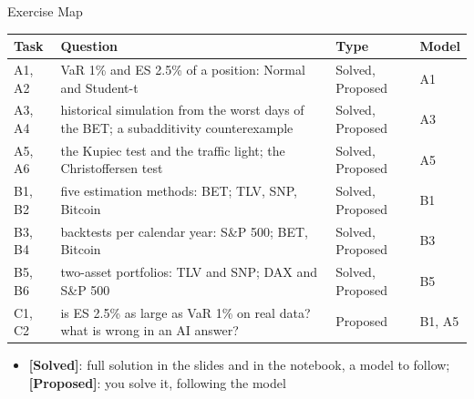 \begin{frame}{Exercise Map}
\itemsize{\small}
\begin{center}
\footnotesize
\begin{tabular}{>{\raggedright\arraybackslash}p{1.1cm}>{\raggedright\arraybackslash}p{7.5cm}>{\raggedright\arraybackslash}p{1.9cm}>{\raggedright\arraybackslash}p{1.4cm}}
\toprule
\textbf{Task} & \textbf{Question} & \textbf{Type} & \textbf{Model} \\
\midrule
A1, A2 & VaR 1\% and ES 2.5\% of a position: Normal and Student-t & Solved, Proposed & A1 \\
A3, A4 & historical simulation from the worst days of the BET; a subadditivity counterexample & Solved, Proposed & A3 \\
A5, A6 & the Kupiec test and the traffic light; the Christoffersen test & Solved, Proposed & A5 \\
B1, B2 & five estimation methods: BET; TLV, SNP, Bitcoin & Solved, Proposed & B1 \\
B3, B4 & backtests per calendar year: S\&P 500; BET, Bitcoin & Solved, Proposed & B3 \\
B5, B6 & two-asset portfolios: TLV and SNP; DAX and S\&P 500 & Solved, Proposed & B5 \\
C1, C2 & is ES 2.5\% as large as VaR 1\% on real data? what is wrong in an AI answer? & Proposed & B1, A5 \\
\bottomrule
\end{tabular}
\end{center}
\begin{itemize}
    \item \textbf{[Solved]}: full solution in the slides and in the notebook, a model to follow; \textbf{[Proposed]}: you solve it, following the model
\end{itemize}
\end{frame}

